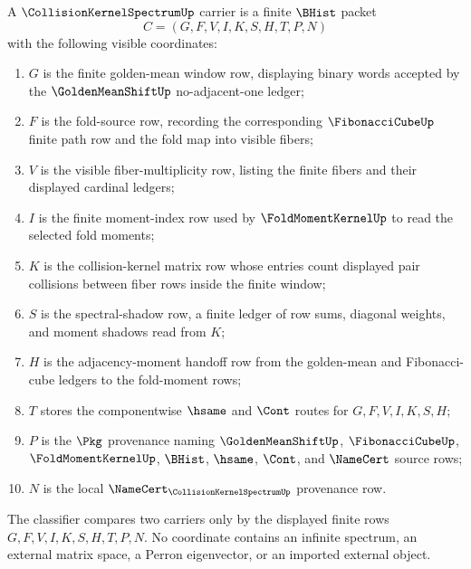 \begin{definition}
\label{def:collision-kernel-spectrum-carrier}
A $\CollisionKernelSpectrumUp$ carrier is a finite $\BHist$ packet
$$
C=(G,F,V,I,K,S,H,T,P,N)
$$
with the following visible coordinates:
\begin{enumerate}
\item $G$ is the finite golden-mean window row, displaying binary words accepted by the $\GoldenMeanShiftUp$ no-adjacent-one ledger;
\item $F$ is the fold-source row, recording the corresponding $\FibonacciCubeUp$ finite path row and the fold map into visible fibers;
\item $V$ is the visible fiber-multiplicity row, listing the finite fibers and their displayed cardinal ledgers;
\item $I$ is the finite moment-index row used by $\FoldMomentKernelUp$ to read the selected fold moments;
\item $K$ is the collision-kernel matrix row whose entries count displayed pair collisions between fiber rows inside the finite window;
\item $S$ is the spectral-shadow row, a finite ledger of row sums, diagonal weights, and moment shadows read from $K$;
\item $H$ is the adjacency-moment handoff row from the golden-mean and Fibonacci-cube ledgers to the fold-moment rows;
\item $T$ stores the componentwise $\hsame$ and $\Cont$ routes for $G,F,V,I,K,S,H$;
\item $P$ is the $\Pkg$ provenance naming $\GoldenMeanShiftUp$, $\FibonacciCubeUp$, $\FoldMomentKernelUp$, $\BHist$, $\hsame$, $\Cont$, and $\NameCert$ source rows;
\item $N$ is the local $\NameCert_{\CollisionKernelSpectrumUp}$ provenance row.
\end{enumerate}
The classifier compares two carriers only by the displayed finite rows $G,F,V,I,K,S,H,T,P,N$. No coordinate contains an infinite spectrum, an external matrix space, a Perron eigenvector, or an imported external object.
\end{definition}


